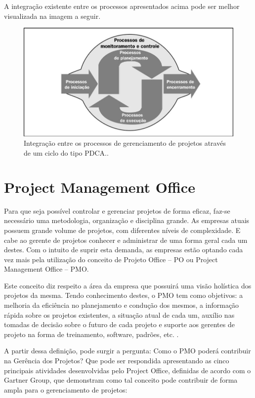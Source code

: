 \documentclass[12pt,a4paper,ruledheader,tocpage=prefix,floatnumber=continuous,pagestart=folhaderosto,font=times]{abnt}
\begin{document}
A integração existente entre os processos apresentados acima pode ser melhor visualizada na imagem a seguir.

\begin{figure}[H]
\centering
\includegraphics[width=.9\textwidth]{pmbok2.JPG}
\caption{Integração entre os processos de gerenciamento de projetos através de um ciclo do tipo PDCA.\cite{pmbok}.}
\end{figure}

\section{Project Management Office}
Para que seja possível controlar e gerenciar projetos de forma eficaz, faz-se necessário uma metodologia, organização e disciplina grande. As empresas 
atuais possuem grande volume de projetos, com diferentes níveis de complexidade. E cabe ao gerente de projetos conhecer e administrar de uma forma geral
cada um destes. Com o intuito de suprir esta demanda, as empresas estão optando cada vez mais pela utilização do conceito de Projeto Office – PO ou Project 
Management Office – PMO.
 
Este conceito diz respeito a área da empresa que possuirá uma visão holística dos projetos da mesma. Tendo conhecimento destes, o PMO tem como objetivos:
a melhoria da eficiência no planejamento e condução dos mesmos, a informação rápida sobre os projetos existentes, a situação atual de cada um, auxílio nas
tomadas de decisão sobre o futuro de cada projeto e suporte aos gerentes de projeto na forma de treinamento, software, padrões, etc. \cite{pmbok}.

A partir dessa definição, pode surgir a pergunta: Como o PMO poderá contribuir na Gerência dos Projetos? Que pode ser respondida apresentando as cinco
principais atividades desenvolvidas pelo Project Office, definidas de acordo com o Gartner Group, que demonstram como tal conceito pode contribuir de 
forma ampla para o gerenciamento de projetos:
\end{document}
